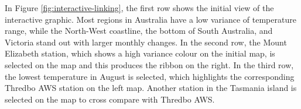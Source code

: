 \documentclass[
]{jss}
\newenvironment{Shaded}{\begin{snugshade}}{\end{snugshade}}
\newcommand{\AttributeTok}[1]{\textcolor[rgb]{0.77,0.63,0.00}{#1}}
\newcommand{\CommentTok}[1]{\textcolor[rgb]{0.56,0.35,0.01}{\textit{#1}}}
\newcommand{\FunctionTok}[1]{\textcolor[rgb]{0.00,0.00,0.00}{#1}}
\newcommand{\NormalTok}[1]{#1}
\newcommand{\OtherTok}[1]{\textcolor[rgb]{0.56,0.35,0.01}{#1}}
\newcommand{\SpecialCharTok}[1]{\textcolor[rgb]{0.00,0.00,0.00}{#1}}
\newcommand{\StringTok}[1]{\textcolor[rgb]{0.31,0.60,0.02}{#1}}
\begin{document}
\begin{Shaded}
\end{Shaded}

In Figure \ref{fig:interactive-linking}, the first row shows the initial view of the interactive graphic. Most regions in Australia have a low variance of temperature range, while the North-West coastline, the bottom of South Australia, and Victoria stand out with larger monthly changes. In the second row, the Mount Elizabeth station, which shows a high variance colour on the initial map, is selected on the map and this produces the ribbon on the right. In the third row, the lowest temperature in August is selected, which highlights the corresponding Thredbo AWS station on the left map. Another station in the Tasmania island is selected on the map to cross compare with Thredbo AWS.
\end{document}
